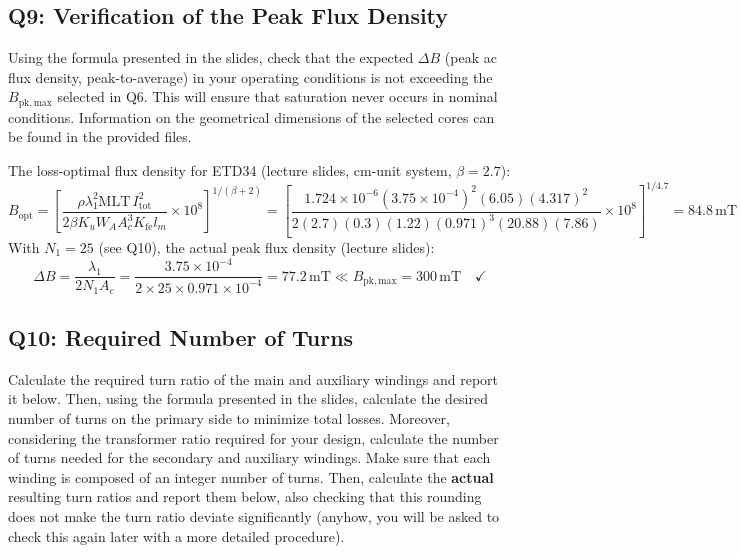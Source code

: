 \documentclass{PELsmallreport}
\begin{document}
\subsection{Q9: Verification of the Peak Flux Density} 
Using the formula presented in the slides, check that the expected $\Delta B$ (peak ac flux density, peak-to-average) in your operating conditions is not exceeding the $B_\mathrm{pk,max}$ selected in Q6. 
This will ensure that saturation never occurs in nominal conditions.
Information on the geometrical dimensions of the selected cores can be found in the provided files.
\\

\begin{framed}
The loss-optimal flux density for ETD34 (lecture slides, cm-unit system, $\beta=2.7$):
\begin{equation}
    B_\mathrm{opt} = \!\left[\frac{\rho\lambda_1^2 \mathrm{MLT}\,I_\mathrm{tot}^2}{2\beta K_u W_A A_c^3 K_\mathrm{fe} l_m}\times10^8\right]^{\!1/(\beta+2)}
    = \!\left[\frac{1.724\!\times\!10^{-6}(3.75\!\times\!10^{-4})^2(6.05)(4.317)^2}{2(2.7)(0.3)(1.22)(0.971)^3(20.88)(7.86)}\times10^8\right]^{\!1/4.7}
    = 84.8\,\mathrm{mT}
\end{equation}
With $N_1=25$ (see Q10), the actual peak flux density (lecture slides):
\begin{equation}
    \Delta B = \frac{\lambda_1}{2 N_1 A_c} = \frac{3.75\!\times\!10^{-4}}{2\times25\times0.971\!\times\!10^{-4}} = 77.2\,\mathrm{mT} \ll B_\mathrm{pk,max}=300\,\mathrm{mT}\quad\checkmark
\end{equation}
\end{framed}

  \hfill{}





\subsection{Q10: Required Number of Turns } 
Calculate the required turn ratio of the main and auxiliary windings and report it below. 
Then, using the formula presented in the slides, calculate the desired number of turns on the primary side to minimize total losses. 
Moreover, considering the transformer ratio required for your design, calculate the number of turns needed for the secondary and auxiliary windings. 
Make sure that each winding is composed of an integer number of turns.
Then, calculate the \textbf{actual} resulting turn ratios and report them below, also checking that this rounding does not make the turn ratio deviate significantly (anyhow, you will be asked to check this again later with a more detailed procedure). 
\end{document}
